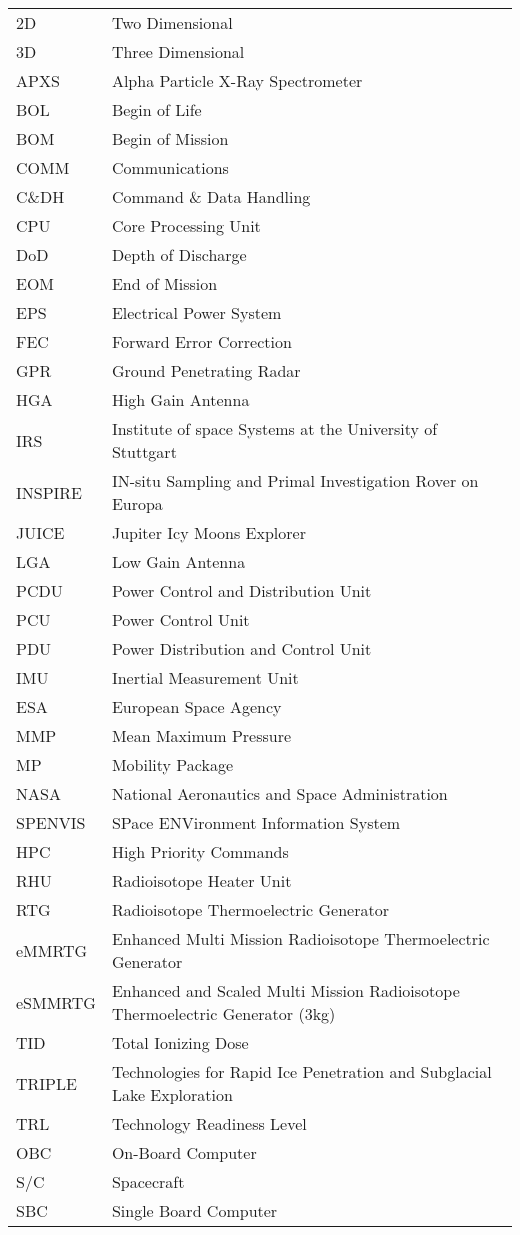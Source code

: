 \begin{longtable}[l]{ll}

2D		& Two Dimensional \\
3D		& Three Dimensional \\
APXS	& Alpha Particle X-Ray Spectrometer \\
BOL     & Begin of Life \\
BOM     & Begin of Mission \\
COMM    & Communications \\
C\&DH	& Command \& Data Handling \\
CPU		& Core Processing Unit \\
DoD     & Depth of Discharge \\
EOM     & End of Mission \\
EPS     & Electrical Power System \\
FEC		& Forward Error Correction \\
GPR		& Ground Penetrating Radar \\
HGA	    & High Gain Antenna \\
IRS     & Institute of space Systems at the University of Stuttgart \\
INSPIRE & IN-situ Sampling and Primal Investigation Rover on Europa \\
JUICE 	& Jupiter Icy Moons Explorer \\
LGA		& Low Gain Antenna \\		
PCDU    & Power Control and Distribution Unit \\
PCU     & Power Control Unit \\
PDU     & Power Distribution and Control Unit \\
IMU     & Inertial Measurement Unit \\
ESA		& European Space Agency	\\
MMP		& Mean Maximum Pressure \\
MP		& Mobility Package \\
NASA    &   National Aeronautics and Space Administration \\
SPENVIS	&	SPace ENVironment Information System	\\
HPC     & High Priority Commands \\
RHU		& Radioisotope Heater Unit\\
RTG     & Radioisotope Thermoelectric Generator \\
eMMRTG  & Enhanced Multi Mission Radioisotope Thermoelectric Generator \\
eSMMRTG & Enhanced and Scaled Multi Mission Radioisotope Thermoelectric Generator (3kg) \\
TID		& Total Ionizing Dose \\
TRIPLE 	& Technologies for Rapid Ice Penetration and Subglacial Lake Exploration \\
TRL     & Technology Readiness Level \\
OBC		& On-Board Computer \\
S/C     & Spacecraft\\
SBC		& Single Board Computer \\



\end{longtable}

